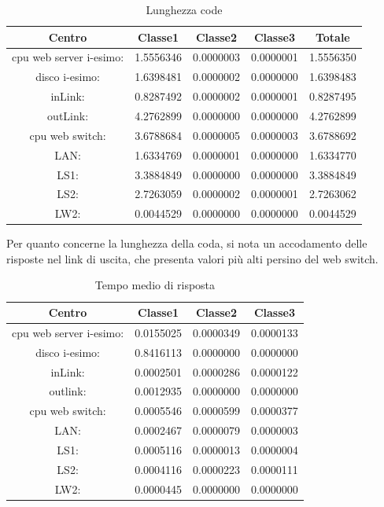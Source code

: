 \begin{table}[H]
\begin{center}
\begin{tabular}{||c|c|c|c|c||}
\hline
Centro &Classe1 &Classe2 &Classe3 &Totale\\
\hline
\hline
 cpu web server i-esimo: 	&1.5556346	&0.0000003	&0.0000001	&1.5556350\\
\hline
 disco i-esimo: 	&1.6398481	&0.0000002	&0.0000000	&1.6398483\\
\hline
 inLink: 	&0.8287492	&0.0000002	&0.0000001	&0.8287495\\
\hline
 outLink: 	&4.2762899	&0.0000000	&0.0000000	&4.2762899\\
\hline
 cpu web switch: 	&3.6788684	&0.0000005	&0.0000003	&3.6788692\\
\hline
 LAN: 	&1.6334769	&0.0000001	&0.0000000	&1.6334770\\
\hline
 LS1: 	&3.3884849	&0.0000000	&0.0000000	&3.3884849\\
\hline
 LS2: 	&2.7263059	&0.0000002	&0.0000001	&2.7263062\\
\hline
 LW2: 	&0.0044529	&0.0000000	&0.0000000	&0.0044529\\
\hline
\end{tabular}
\end{center}
\caption{Lunghezza code}
\label{ris}
\end{table}
Per quanto concerne la lunghezza della coda, si nota un accodamento delle risposte nel link di uscita, che presenta valori più alti persino del web switch.
\begin{table}[htbp]
\caption{Tempo medio di risposta}
\begin{center}
\begin{tabular}{||c|c|c|c||}
\hline
Centro &Classe1 &Classe2 &Classe3\\
\hline
\hline
 cpu web server i-esimo: 	&0.0155025	&0.0000349	&0.0000133\\
\hline
 disco i-esimo: 	&0.8416113	&0.0000000	&0.0000000\\
\hline
 inLink: 	&0.0002501	&0.0000286	&0.0000122\\
\hline
 outlink: 	&0.0012935	&0.0000000	&0.0000000\\
\hline
 cpu web switch: 	&0.0005546	&0.0000599	&0.0000377\\
\hline
 LAN: 	&0.0002467	&0.0000079	&0.0000003\\
\hline
 LS1: 	&0.0005116	&0.0000013	&0.0000004\\
\hline
 LS2: 	&0.0004116	&0.0000223	&0.0000111\\
\hline
 LW2: 	&0.0000445	&0.0000000	&0.0000000\\
\hline
\end{tabular}
\end{center}
\label{tempomediorisposta}
\end{table}
